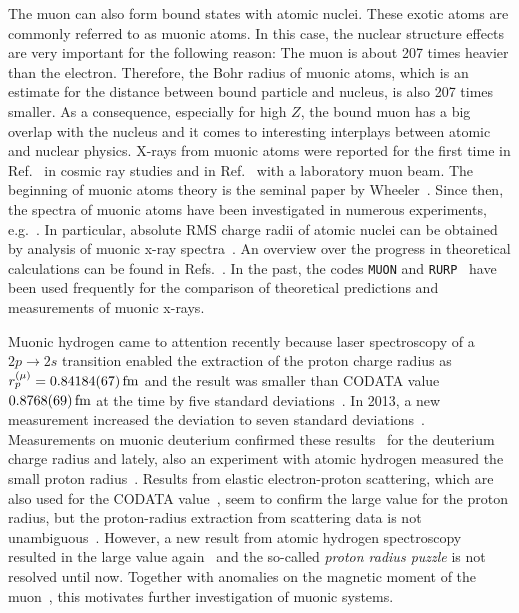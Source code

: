 The muon can also form bound states with atomic nuclei. These exotic atoms are commonly referred to as muonic atoms. In this case, the nuclear structure effects are very important for the following reason: The muon is about 207 times heavier than the electron. Therefore, the Bohr radius of muonic atoms, which is an estimate for the distance between bound particle and nucleus, is also 207 times smaller. As a consequence, especially for high $Z$, the bound muon has a big overlap with the nucleus and it comes to interesting interplays between atomic and nuclear physics. X-rays from muonic atoms were reported for the first time in Ref.~\cite{chang1949} in cosmic ray studies and in Ref.~\cite{fitch1953} with a laboratory muon beam. The beginning of muonic atoms theory is the seminal paper by Wheeler~\cite{wheeler1949}.  Since then, the spectra of muonic atoms have been investigated in numerous experiments, e.g.~\cite{hitlin1970,zehnder1975,powers1976,Yamazaki1978,tanaka1983,tanaka1984,tanaka1984_2,Bergem1988,
powers1977}. In particular, absolute RMS charge radii of atomic nuclei can be obtained by analysis of muonic x-ray spectra~\cite{FRICKE1995}. An overview over the progress in theoretical calculations can be found in Refs.~\cite{BorieRinker1982,Devons1995,wu1969}. In the past, the codes \texttt{MUON} and \texttt{RURP}~\cite{rinker1979} have been used frequently for the comparison of theoretical predictions and measurements of muonic x-rays. 

Muonic hydrogen came to attention recently because laser spectroscopy of a \mbox{\small{$2p\rightarrow 2s$}} transition enabled the extraction of the proton charge radius as $r_p^{(\mu)}=0.84184(67)\,\rm{fm}$ and the result was smaller than CODATA value $0.8768(69)\,\rm{fm}$ at the time by five standard deviations~\cite{Pohl2010}. In 2013, a new measurement increased the deviation to seven standard deviations~\cite{antognini2013}. Measurements on muonic deuterium confirmed these results~\cite{pohl2016} for the deuterium charge radius and lately, also an experiment with atomic hydrogen measured the small proton radius~\cite{beyer2017}.
Results from elastic electron-proton scattering, which are also used for the CODATA value~\cite{CODATA2014}, seem to confirm the large value for the proton radius, but the proton-radius extraction from scattering data is not unambiguous~\cite{arrington2015}. However, a new result from atomic hydrogen spectroscopy resulted in the large value again~\cite{fleurbaey2018} and the so-called \textit{proton radius puzzle} is not resolved until now. Together with anomalies on the magnetic moment of the muon~\cite{bennett2006}, this motivates further investigation of muonic systems.


